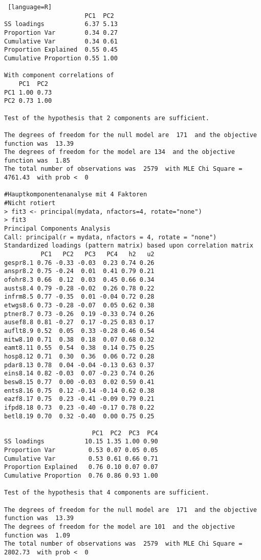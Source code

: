 \begin{lstlisting} [language=R]
                      PC1  PC2
SS loadings           6.37 5.13
Proportion Var        0.34 0.27
Cumulative Var        0.34 0.61
Proportion Explained  0.55 0.45
Cumulative Proportion 0.55 1.00

With component correlations of 
    PC1  PC2
PC1 1.00 0.73
PC2 0.73 1.00

Test of the hypothesis that 2 components are sufficient.

The degrees of freedom for the null model are  171  and the objective function was  13.39
The degrees of freedom for the model are 134  and the objective function was  1.85 
The total number of observations was  2579  with MLE Chi Square =  4761.43  with prob <  0 

#Hauptkomponentenanalyse mit 4 Faktoren
#Nicht rotiert
> fit3 <- principal(mydata, nfactors=4, rotate="none")
> fit3
Principal Components Analysis
Call: principal(r = mydata, nfactors = 4, rotate = "none")
Standardized loadings (pattern matrix) based upon correlation matrix
          PC1   PC2   PC3   PC4   h2   u2
gespr8.1 0.76 -0.33 -0.03  0.23 0.74 0.26
anspr8.2 0.75 -0.24  0.01  0.41 0.79 0.21
ofohr8.3 0.66  0.12  0.03  0.45 0.66 0.34
austs8.4 0.79 -0.28 -0.02  0.26 0.78 0.22
infrm8.5 0.77 -0.35  0.01 -0.04 0.72 0.28
etwgs8.6 0.73 -0.28 -0.07  0.05 0.62 0.38
ptner8.7 0.73 -0.26  0.19 -0.33 0.74 0.26
ausef8.8 0.81 -0.27  0.17 -0.25 0.83 0.17
auflt8.9 0.52  0.05  0.33 -0.28 0.46 0.54
mitw8.10 0.71  0.38  0.18  0.07 0.68 0.32
eamt8.11 0.55  0.54  0.38  0.14 0.75 0.25
hosp8.12 0.71  0.30  0.36  0.06 0.72 0.28
pdar8.13 0.78  0.04 -0.04 -0.13 0.63 0.37
eins8.14 0.82 -0.03  0.07 -0.23 0.74 0.26
besw8.15 0.77  0.00 -0.03  0.02 0.59 0.41
ents8.16 0.75  0.12 -0.14 -0.14 0.62 0.38
eazf8.17 0.75  0.23 -0.41 -0.09 0.79 0.21
ifpd8.18 0.73  0.23 -0.40 -0.17 0.78 0.22
betl8.19 0.70  0.32 -0.40  0.00 0.75 0.25

                        PC1  PC2  PC3  PC4
SS loadings           10.15 1.35 1.00 0.90
Proportion Var         0.53 0.07 0.05 0.05
Cumulative Var         0.53 0.61 0.66 0.71
Proportion Explained   0.76 0.10 0.07 0.07
Cumulative Proportion  0.76 0.86 0.93 1.00

Test of the hypothesis that 4 components are sufficient.

The degrees of freedom for the null model are  171  and the objective function was  13.39
The degrees of freedom for the model are 101  and the objective function was  1.09 
The total number of observations was  2579  with MLE Chi Square =  2802.73  with prob <  0 


\end{lstlisting}
